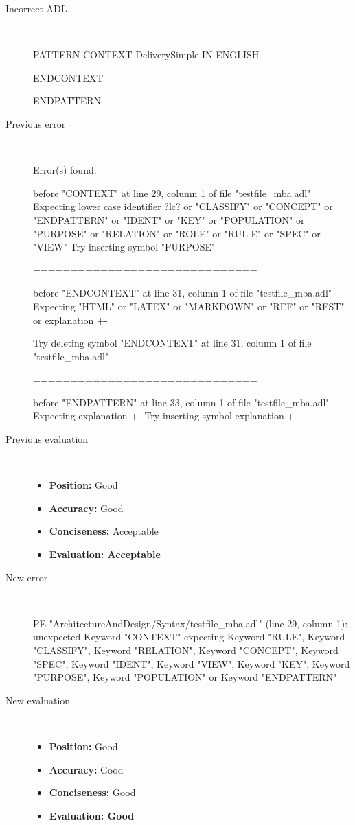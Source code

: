 \hrulefill

\begin{description}
  \item[Incorrect ADL]~\\
\begin{adl}
PATTERN
CONTEXT DeliverySimple IN ENGLISH

ENDCONTEXT

ENDPATTERN\end{adl}
  \item[Previous error]~\\
\begin{haskell}
Error(s) found:

before "CONTEXT" at line 29, column 1 of file "testfile_mba.adl"
Expecting lower case identifier ?lc? or "CLASSIFY" or "CONCEPT" or "ENDPATTERN"
or "IDENT" or "KEY" or "POPULATION" or "PURPOSE" or "RELATION" or "ROLE" or "RUL
E" or "SPEC" or "VIEW"
Try inserting symbol "PURPOSE"

==============================

before "ENDCONTEXT" at line 31, column 1 of file "testfile_mba.adl"
Expecting "HTML" or "LATEX" or "MARKDOWN" or "REF" or "REST" or explanation {+-}

Try deleting symbol "ENDCONTEXT" at line 31, column 1 of file "testfile_mba.adl"


==============================

before "ENDPATTERN" at line 33, column 1 of file "testfile_mba.adl"
Expecting explanation {+-}
Try inserting symbol explanation {+-}\end{haskell}
  \item[Previous evaluation]~\\
    \begin{itemize}
    \item \textbf{Position:} Good
    \item \textbf{Accuracy:} Good
    \item \textbf{Conciseness:} Acceptable
    \item \textbf{Evaluation: Acceptable}
    \end{itemize}
  \item[New error]~\\
\begin{haskell}
PE "ArchitectureAndDesign/Syntax/testfile_mba.adl" (line 29, column 1):
unexpected Keyword "CONTEXT"
expecting Keyword "RULE", Keyword "CLASSIFY", Keyword "RELATION", Keyword "CONCEPT", Keyword "SPEC", Keyword "IDENT", Keyword "VIEW", Keyword "KEY", Keyword "PURPOSE", Keyword "POPULATION" or Keyword "ENDPATTERN"
\end{haskell}
  \item[New evaluation]~\\
    \begin{itemize}
    \item \textbf{Position:} Good
    \item \textbf{Accuracy:} Good
    \item \textbf{Conciseness:} Good
    \item \textbf{Evaluation: Good}
    \end{itemize}
  \end{description}

